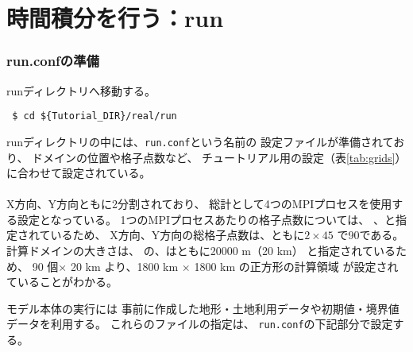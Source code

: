 
\section{時間積分を行う：run}
\subsubsection{run.confの準備}
runディレクトリへ移動する。
\begin{verbatim}
 $ cd ${Tutorial_DIR}/real/run
\end{verbatim}
%
runディレクトリの中には、\verb|run.conf|という名前の
設定ファイルが準備されており、
ドメインの位置や格子点数など、
チュートリアル用の設定（表\ref{tab:grids}）に合わせて設定されている。\\

\\


X方向、Y方向ともに2分割されており、
総計として4つのMPIプロセスを使用する設定となっている。
1つのMPIプロセスあたりの格子点数については、
、と指定されているため、
X方向、Y方向の総格子点数は、ともに$2 \times 45$ で90である。
計算ドメインの大きさは、
の、はともに20000 m（20 km）
と指定されているため、
90 個$\times$ 20 km より、1800 km $\times$ 1800 km の正方形の計算領域
が設定されていることがわかる。


モデル本体の実行には
事前に作成した地形・土地利用データや初期値・境界値データを利用する。
これらのファイルの指定は、
\verb|run.conf|の下記部分で設定する。\\

